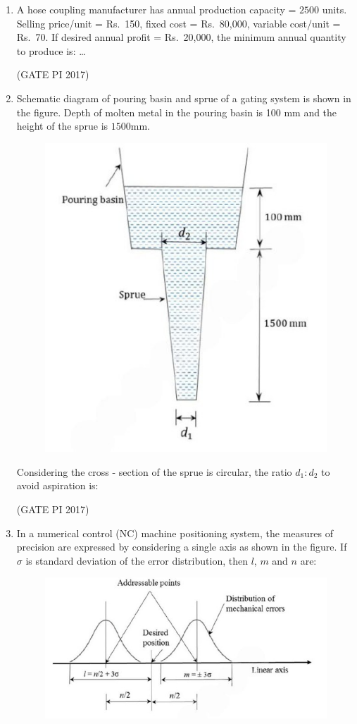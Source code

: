 \documentclass[journal,12pt,onecolumn]{IEEEtran}
\theoremstyle{remark}
\begin{document}
\begin{enumerate}
\item A hose coupling manufacturer has annual production capacity = $2500$ units.  
Selling price/unit = Rs.\ 150, fixed cost = Rs.\ 80{,}000, variable cost/unit = Rs.\ 70.  
If desired annual profit = Rs.\ 20{,}000, the minimum annual quantity to produce is:  
\dots 

\hfill (GATE PI 2017)

\item Schematic diagram of pouring basin and sprue of a gating system is shown in the figure.  
Depth of molten metal in the pouring basin is 100 mm and the height of the sprue is $1500$mm.  



\begin{figure}[H]
    \centering
    \includegraphics[width=0.3\columnwidth]{fig9.png}
    \caption{}
    \label{fig:placeholder}
\end{figure}

Considering the cross \-- section of the sprue is circular, the ratio $d_{1} : d_{2}$ to avoid aspiration is:

\begin{enumerate}
\end{enumerate}
\hfill (GATE PI 2017)

\item In a numerical control (NC) machine positioning system, the measures of precision are expressed by considering a single axis as shown in the figure.  
If $\sigma$ is standard deviation of the error distribution, then  $l$, $m$ and $n$ are:

\begin{figure}[H]
    \centering
    \includegraphics[width=0.5\columnwidth]{fig11.png}
    \caption{}
    \label{fig:placeholder}
\end{figure}


\end{enumerate}
\end{document}
